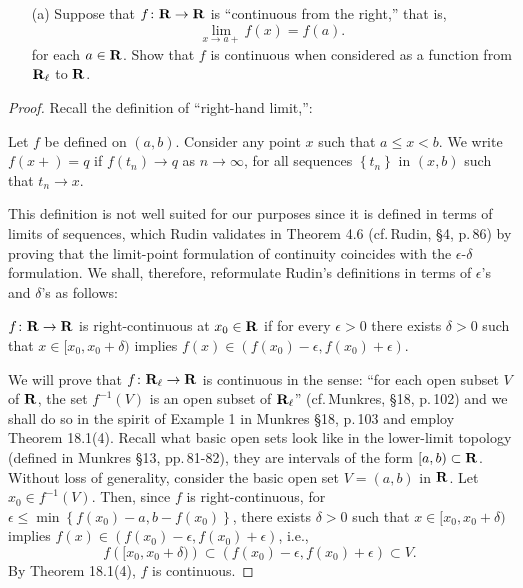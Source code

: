 \begin{problem}[Munkres \S18, p.\,111, \#7(a)]
\begin{enumerate}[noitemsep]
\item[(a)] Suppose that $f\colon\mathbf{R}\to\mathbf{R}$ is ``continuous from
  the right,'' that is,
  \[
    \lim_{x\to a+}f(x)=f(a).
  \]
  for each $a\in\mathbf{R}$. Show that $f$ is continuous when considered
  as a function from $\mathbf{R}_\ell$ to $\mathbf{R}$.
\end{enumerate}
\end{problem}
\begin{proof}
Recall the definition of ``right-hand limit,'':
\begin{definition*}
Let $f$ be defined on $(a,b)$. Consider any point $x$ such that
$a\leq x<b$. We write $f(x+)=q$ if $f(t_n)\to q$ as $n\to\infty$,
for all sequences $\left\{t_n\right\}$ in $(x,b)$ such that
$t_n\to x$.
\end{definition*}
This definition is not well suited for our purposes since it is
defined in terms of limits of sequences, which Rudin validates in
Theorem 4.6 (cf.\,Rudin, \S4, p.\,86) by proving that the limit-point
formulation of continuity coincides with the $\epsilon$-$\delta$
formulation. We shall, therefore, reformulate Rudin's definitions
in terms of $\epsilon$'s and $\delta$'s as follows:
\begin{definition*}
$f\colon\mathbf{R}\to\mathbf{R}$ is right-continuous at $x_0\in\mathbf{R}$ if for
every $\epsilon>0$ there exists $\delta>0$ such that $x\in
[x_0,x_0+\delta)$ implies
$f(x)\in\left(f(x_0)-\epsilon,f(x_0)+\epsilon\right)$.
\end{definition*}
We will prove that $f\colon\mathbf{R}_\ell\to\mathbf{R}$ is continuous in the
sense: ``for each open subset $V$ of $\mathbf{R}$, the set $f^{-1}(V)$
is an open subset of $\mathbf{R}_\ell$'' (cf.\,Munkres, \S18,
p.\,102) and we shall do so in the spirit of Example 1 in Munkres
\S18, p.\,103 and employ Theorem 18.1(4). Recall what basic open
sets look like in the lower-limit topology (defined in Munkres
\S13, pp.\,81-82), they are intervals of the form
$[a,b)\subset\mathbf{R}$. Without loss of generality, consider the basic
open set $V=(a,b)$ in $\mathbf{R}$. Let $x_0\in f^{-1}(V)$. Then, since
$f$ is right-continuous, for
$\epsilon\leq\min\left\{f(x_0)-a,b-f(x_0)\right\}$, there exists
$\delta>0$ such that $x\in[x_0,x_0+\delta)$ implies
$f(x)\in\left(f(x_0)-\epsilon,f(x_0)+\epsilon\right)$, i.e.,
\[
f\left([x_0,x_0+\delta)\right)\subset\left(f(x_0)-\epsilon,f(x_0)+\epsilon\right)\subset
V.
\]
By Theorem 18.1(4), $f$ is continuous.
\end{proof}

